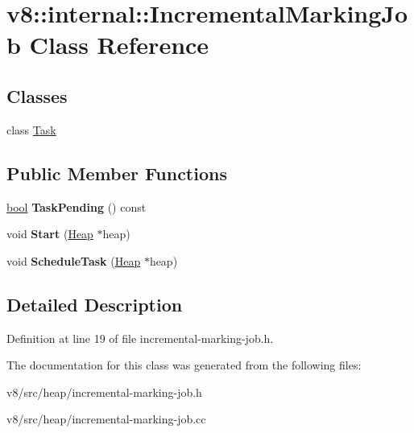 \hypertarget{classv8_1_1internal_1_1IncrementalMarkingJob}{}\section{v8\+:\+:internal\+:\+:Incremental\+Marking\+Job Class Reference}
\label{classv8_1_1internal_1_1IncrementalMarkingJob}
\subsection*{Classes}
\begin{DoxyCompactItemize}
\item 
class \mbox{\hyperlink{classv8_1_1internal_1_1IncrementalMarkingJob_1_1Task}{Task}}
\end{DoxyCompactItemize}
\subsection*{Public Member Functions}
\begin{DoxyCompactItemize}
\item 
\mbox{\label{classv8_1_1internal_1_1IncrementalMarkingJob_ad238c5cf96f0a7d6708e2a2b1ff983f7}} 
\mbox{\hyperlink{classbool}{bool}} {\bfseries Task\+Pending} () const
\item 
\mbox{\label{classv8_1_1internal_1_1IncrementalMarkingJob_ad8386ebe35f8d71d345ff8bc42490fae}} 
void {\bfseries Start} (\mbox{\hyperlink{classv8_1_1internal_1_1Heap}{Heap}} $\ast$heap)
\item 
\mbox{\label{classv8_1_1internal_1_1IncrementalMarkingJob_a8dccda06fbdb02d6e78c487704e35d79}} 
void {\bfseries Schedule\+Task} (\mbox{\hyperlink{classv8_1_1internal_1_1Heap}{Heap}} $\ast$heap)
\end{DoxyCompactItemize}


\subsection{Detailed Description}


Definition at line 19 of file incremental-\/marking-\/job.\+h.



The documentation for this class was generated from the following files\+:\begin{DoxyCompactItemize}
\item 
v8/src/heap/incremental-\/marking-\/job.\+h\item 
v8/src/heap/incremental-\/marking-\/job.\+cc\end{DoxyCompactItemize}
